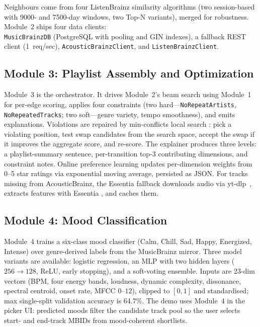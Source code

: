 Neighbours come from four ListenBrainz similarity algorithms (two session-based with 9000- and 7500-day windows, two Top-N variants), merged for robustness. Module~2 ships four data clients: \\ \texttt{MusicBrainzDB} (PostgreSQL with pooling and GIN indexes), a fallback REST client (1~req/sec), \texttt{AcousticBrainzClient}, and \texttt{ListenBrainzClient}.

\subsection{Module 3: Playlist Assembly and Optimization}

Module~3 is the orchestrator. It drives Module~2's beam search using Module~1 for per-edge scoring, applies four constraints (two hard---\texttt{NoRepeatArtists}, \texttt{NoRepeatedTracks}; two soft---genre variety, tempo smoothness), and emits explanations. Violations are repaired by min-conflicts local search \cite{minton1992}: pick a violating position, test swap candidates from the search space, accept the swap if it improves the aggregate score, and re-score. The explainer produces three levels: a playlist-summary sentence, per-transition top-3 contributing dimensions, and constraint notes. Online preference learning updates per-dimension weights from 0--5 star ratings via exponential moving average, persisted as JSON. For tracks missing from AcousticBrainz, the Essentia fallback downloads audio via yt-dlp~\cite{ytdlp2024}, extracts features with Essentia \cite{bogdanov2013}, and caches them.

\subsection{Module 4: Mood Classification}

Module~4 trains a six-class mood classifier (Calm, Chill, Sad, Happy, Energized, Intense) over genre-derived labels from the MusicBrainz mirror. Three model variants are available: logistic regression, an MLP with two hidden layers ($256 \to 128$, ReLU, early stopping), and a soft-voting ensemble. Inputs are 23-dim vectors (BPM, four energy bands, loudness, dynamic complexity, dissonance, spectral centroid, onset rate, MFCC $0$--$12$), clipped to $[0,1]$ and standardised; max single-split validation accuracy is 64.7\%. The demo uses Module~4 in the picker UI: predicted moods filter the candidate track pool so the user selects start- and end-track MBIDs from mood-coherent shortlists.

